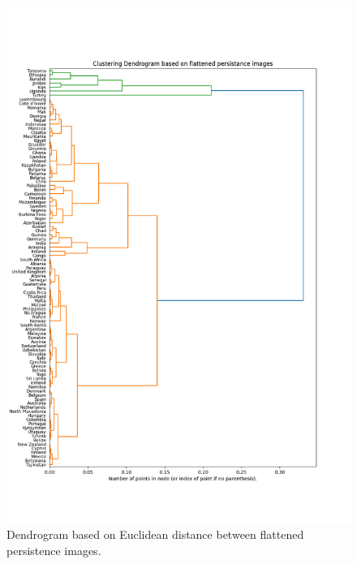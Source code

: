 \documentclass[12pt]{article}
\begin{document}
\begin{figure}[t]
	\centering
	\includegraphics[width=15cm]{perimg.png}
	\caption{Dendrogram based on Euclidean distance between flattened persistence images.}
\end{figure}
\end{document}
